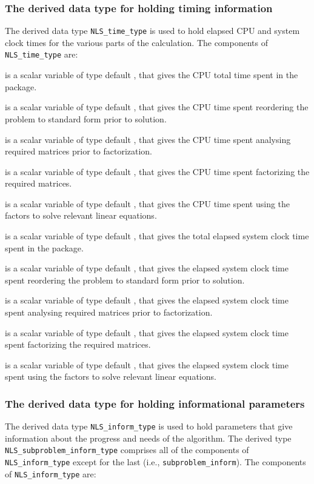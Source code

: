 \documentclass{galahad}
\newcommand{\packagename}{NLS}
\begin{document}
\subsubsection{The derived data type for holding timing
 information}\label{typetime}
The derived data type
{\tt \packagename\_time\_type}
is used to hold elapsed CPU and system clock times for the various parts
of the calculation. The components of
{\tt \packagename\_time\_type}
are:
\begin{description}
 is a scalar variable of type default \real, that gives
 the CPU total time spent in the package.

 is a scalar variable of type default \realdp, that gives
 the CPU time spent reordering the problem to standard form prior to solution.

 is a scalar variable of type default \realdp, that gives
 the CPU time spent analysing required matrices prior to factorization.

 is a scalar variable of type default \realdp, that gives
 the CPU time spent factorizing the required matrices.

 is a scalar variable of type default \realdp, that gives
 the CPU time spent using the factors to solve relevant linear equations.

 is a scalar variable of type default \real, that gives
 the total elapsed system clock time spent in the package.

 is a scalar variable of type default \realdp, that gives
 the elapsed system clock time spent reordering the problem to standard form
prior to solution.

 is a scalar variable of type default \realdp, that gives
 the  elapsed system clock time spent analysing required matrices prior to
factorization.

 is a scalar variable of type default \realdp, that gives
 the  elapsed system clock time spent factorizing the required matrices.

 is a scalar variable of type default \realdp, that gives
 the  elapsed system clock time spent using the factors to solve relevant
linear equations.

\end{description}


\subsubsection{The derived data type for holding informational
 parameters}\label{typeinform}
The derived data type
{\tt \packagename\_inform\_type}
is used to hold parameters that give information about the progress and needs
of the algorithm.
The derived type {\tt \packagename\_subproblem\_inform\_type}
comprises all of the components of {\tt \packagename\_inform\_type}
except for the last (i.e., {\tt subproblem\_inform}).
The components of
{\tt \packagename\_inform\_type}
are:
\end{document}
